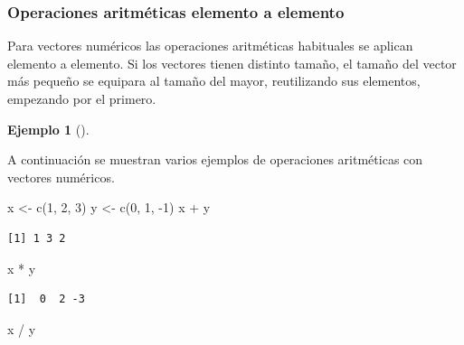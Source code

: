 \documentclass[
  a4paper,
]{scrreport}
\newenvironment{Shaded}{\begin{snugshade}}{\end{snugshade}}
\newcommand{\DecValTok}[1]{\textcolor[rgb]{0.68,0.00,0.00}{#1}}
\newcommand{\FunctionTok}[1]{\textcolor[rgb]{0.28,0.35,0.67}{#1}}
\newcommand{\NormalTok}[1]{\textcolor[rgb]{0.00,0.23,0.31}{#1}}
\newcommand{\OtherTok}[1]{\textcolor[rgb]{0.00,0.23,0.31}{#1}}
\newcommand{\SpecialCharTok}[1]{\textcolor[rgb]{0.37,0.37,0.37}{#1}}
\theoremstyle{definition}
\newtheorem{example}{Ejemplo}[chapter]
\theoremstyle{definition}
\theoremstyle{remark}
\begin{document}
\hypertarget{operaciones-aritmuxe9ticas-elemento-a-elemento}{%
\subsubsection{Operaciones aritméticas elemento a
elemento}\label{operaciones-aritmuxe9ticas-elemento-a-elemento}}

Para vectores numéricos las operaciones aritméticas habituales se
aplican elemento a elemento. Si los vectores tienen distinto tamaño, el
tamaño del vector más pequeño se equipara al tamaño del mayor,
reutilizando sus elementos, empezando por el primero.

\leavevmode{}%
\begin{example}[]\label{exm-operaciones-aritmeticas-vectores}

A continuación se muestran varios ejemplos de operaciones aritméticas
con vectores numéricos.

\begin{Shaded}
\begin{Highlighting}[]
\NormalTok{x }\OtherTok{\textless{}{-}} \FunctionTok{c}\NormalTok{(}\DecValTok{1}\NormalTok{, }\DecValTok{2}\NormalTok{, }\DecValTok{3}\NormalTok{)}
\NormalTok{y }\OtherTok{\textless{}{-}} \FunctionTok{c}\NormalTok{(}\DecValTok{0}\NormalTok{, }\DecValTok{1}\NormalTok{, }\SpecialCharTok{{-}}\DecValTok{1}\NormalTok{)}
\NormalTok{x }\SpecialCharTok{+}\NormalTok{ y}
\end{Highlighting}
\end{Shaded}

\begin{verbatim}
[1] 1 3 2
\end{verbatim}

\begin{Shaded}
\begin{Highlighting}[]
\NormalTok{x }\SpecialCharTok{*}\NormalTok{ y}
\end{Highlighting}
\end{Shaded}

\begin{verbatim}
[1]  0  2 -3
\end{verbatim}

\begin{Shaded}
\begin{Highlighting}[]
\NormalTok{x }\SpecialCharTok{/}\NormalTok{ y}
\end{Highlighting}
\end{Shaded}


\end{example}
\end{document}
